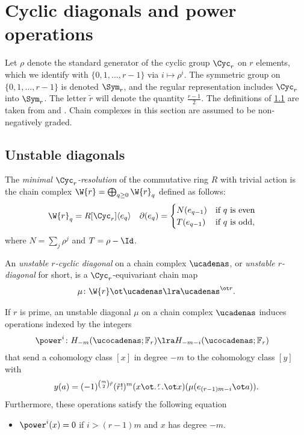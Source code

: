 
\section{Cyclic diagonals and power operations}\label{s:2bdiagonals}

Let $\rho$ denote the standard generator of the cyclic group $\Cyc_r$ on $r$ elements, which we identify with $\{0,1,\dots,r-1\}$ via $i\mapsto \rho^i$.
The symmetric group on $\{0,1,\dots,r-1\}$ is denoted $\Sym_r$, and the regular representation includes $\Cyc_r$ into $\Sym_r$.
The letter $\tilde{r}$ will denote the quantity $\frac{r-1}{2}$.
The definitions of \cref{s:unstable} are taken from \cite{may1970general} and \cite{medina2021may_st}.
{\color{red} Chain complexes in this section are assumed to be non-negatively graded.}

\subsection{Unstable diagonals}\label{s:unstable}

The \emph{minimal $\Cyc_r$-resolution} of the commutative ring $R$ with trivial action is the chain complex $\W{r} = \bigoplus_{q \geq 0} \W{r}_q$ defined as follows:
\begin{align*}
	\W{r}_q &= R[\Cyc_r]\langle e_q\rangle &
	\partial(e_q) &= \begin{cases}
		N(e_{q-1}) & \text{if $q$ is even} \\
		T(e_{q-1}) & \text{if $q$ is odd,}
	\end{cases}
\end{align*}
where $N = \sum_j \rho^j$ and $T = \rho - \Id$.

\begin{definition}
	An \emph{unstable $r$-cyclic diagonal} on a chain complex $\ucadenas$, or \emph{unstable $r$-diagonal} for short, is a $\Cyc_r$-equivariant chain map
	\[
	\mu \colon \W{r} \ot \ucadenas \lra \ucadenas^{\ot r}.
	\]
\end{definition}

\begin{proposition}\label{prop:unstable}
	If $r$ is prime, an unstable diagonal $\mu$ on a chain complex $\ucadenas$ induces operations indexed by the integers
	\begin{align*}
		\power^{i} \colon H_{-m}(\ucocadenas;\mathbb{F}_r)& \lra H_{-m-i}(\ucocadenas;\mathbb{F}_r)
	\end{align*}
	that send a cohomology class $[x]$ in degree $-m$ to the cohomology class $[y]$ with
	\[
	y(a) = (-1)^{\binom{m}{2} \tilde{r}}(\tilde{r}!)^m(x \ot \overset{r}{\dots} \ot x)(\mu(e_{(r-1)m-i} \ot a)).
	\]
	Furthermore, these operations satisfy the following equation
	\begin{itemize}
		\item $\power^i(x) = 0$ if $i>(r-1)m$ and $x$ has degree $-m$.
	\end{itemize}
\end{proposition}

